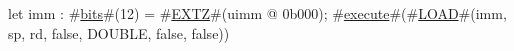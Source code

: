 let imm : #\hyperref[sailRISCVzbits]{bits}#(12) = #\hyperref[sailRISCVzEXTZ]{EXTZ}#(uimm @ 0b000);
#\hyperref[sailRISCVzexecute]{execute}#(#\hyperref[sailRISCVzLOAD]{LOAD}#(imm, sp, rd, false, DOUBLE, false, false))
